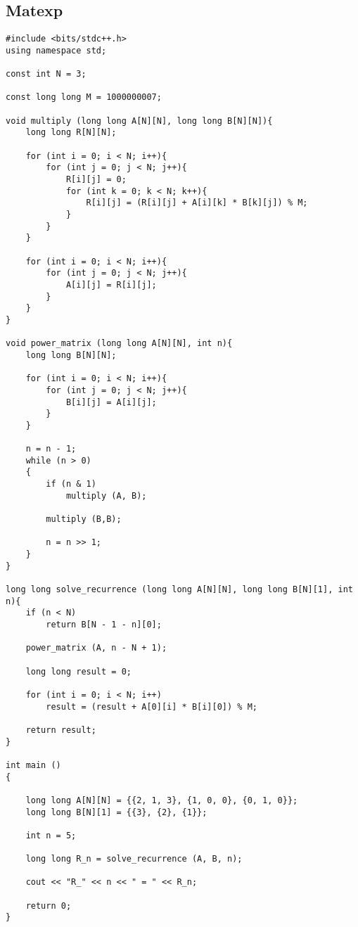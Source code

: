 \subsection{Matexp}
\begin{lstlisting}
#include <bits/stdc++.h>
using namespace std;

const int N = 3;

const long long M = 1000000007;

void multiply (long long A[N][N], long long B[N][N]){
    long long R[N][N];

    for (int i = 0; i < N; i++){
        for (int j = 0; j < N; j++){
            R[i][j] = 0;
            for (int k = 0; k < N; k++){
                R[i][j] = (R[i][j] + A[i][k] * B[k][j]) % M;
            }
        }
    }

    for (int i = 0; i < N; i++){
        for (int j = 0; j < N; j++){
            A[i][j] = R[i][j];
        }
    }
}

void power_matrix (long long A[N][N], int n){
    long long B[N][N];

    for (int i = 0; i < N; i++){
        for (int j = 0; j < N; j++){
            B[i][j] = A[i][j];
        }
    }

    n = n - 1;
    while (n > 0)
    {
        if (n & 1)
            multiply (A, B);

        multiply (B,B);

        n = n >> 1;  
    }
}

long long solve_recurrence (long long A[N][N], long long B[N][1], int n){
    if (n < N)
        return B[N - 1 - n][0];
    
    power_matrix (A, n - N + 1);
    
    long long result = 0;
    
    for (int i = 0; i < N; i++)
        result = (result + A[0][i] * B[i][0]) % M;
    
    return result;
}

int main ()
{

    long long A[N][N] = {{2, 1, 3}, {1, 0, 0}, {0, 1, 0}};
    long long B[N][1] = {{3}, {2}, {1}};
    
    int n = 5;
    
    long long R_n = solve_recurrence (A, B, n);
    
    cout << "R_" << n << " = " << R_n; 

    return 0;
}
\end{lstlisting}

